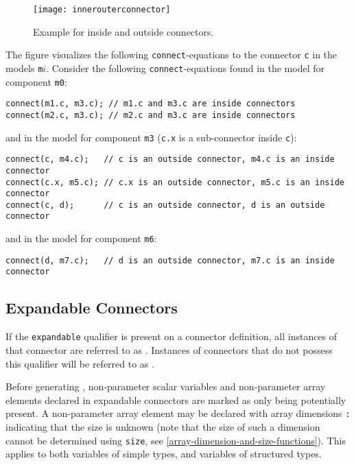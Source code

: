 \begin{example}
\begin{figure}[H]
  \begin{center}
    \texttt{[image: innerouterconnector]}
  \end{center}
  \caption{Example for inside and outside connectors.}
\end{figure}
The figure visualizes the following \lstinline!connect!-equations to the connector \lstinline!c! in the models \lstinline!m!$i$.
Consider the following \lstinline!connect!-equations found in the model for component \lstinline!m0!:
\begin{lstlisting}[language=modelica]
connect(m1.c, m3.c); // m1.c and m3.c are inside connectors
connect(m2.c, m3.c); // m2.c and m3.c are inside connectors
\end{lstlisting}
and in the model for component \lstinline!m3! (\lstinline!c.x! is a sub-connector inside \lstinline!c!):
\begin{lstlisting}[language=modelica]
connect(c, m4.c);   // c is an outside connector, m4.c is an inside connector
connect(c.x, m5.c); // c.x is an outside connector, m5.c is an inside connector
connect(c, d);      // c is an outside connector, d is an outside connector
\end{lstlisting}
and in the model for component \lstinline!m6!:
\begin{lstlisting}[language=modelica]
connect(d, m7.c);   // d is an outside connector, m7.c is an inside connector
\end{lstlisting}
\end{example}

\subsection{Expandable Connectors}\label{expandable-connectors}

If the \lstinline!expandable! qualifier is present on a connector definition, all instances of that connector are referred to as .
Instances of connectors that do not possess this qualifier will be referred to as .

Before generating , non-parameter scalar variables and non-parameter array elements declared in expandable connectors are marked as only being potentially present.
A non-parameter array element may be declared with array dimensions \lstinline!:! indicating that the size is unknown (note that the size of such a dimension cannot be determined using \lstinline!size!, see \cref{array-dimension-and-size-functions}).
This applies to both variables of simple types, and variables of structured types.

